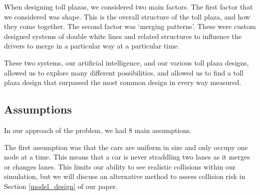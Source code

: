 \documentclass[a4paper, 11pt]{article}
\begin{document}
When designing toll plazas, we considered two main factors. The first factor that we considered was shape. This is the overall structure of the toll plaza, and how they come together. The second factor was `merging patterns'. These were custom designed systems of double white lines and related structures to influence the drivers to merge in a particular way at a particular time. 

These two systems, our artificial intelligence, and our various toll plaza designs, allowed us to explore many different possibilities, and allowed us to find a toll plaza design that surpassed the most common design in every way measured. 





\subsection{Assumptions}

In our approach of the problem, we had 8 main assumptions.

The first assumption was that the cars are uniform in size and only occupy one node at a time. This means that a car is never straddling two lanes as it merges or changes lanes. This limits our ability to see realistic collisions within our simulation, but we will discuss an alternative method to assess collision risk in Section \ref{model_design} of our paper.
\end{document}
